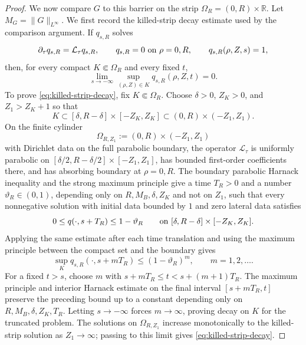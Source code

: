 \documentclass[11pt]{amsart}
\numberwithin{equation}{section}
\theoremstyle{plain}
\theoremstyle{definition}
\theoremstyle{remark}
\begin{document}
\begin{proof}
We now compare \(G\) to this barrier on the strip
\(\Omega_R=(0,R)\times\mathbb R\).  Let
\(M_G=\|G\|_{L^\infty}\).  We first record the killed-strip decay estimate used
by the comparison argument.  If \(q_{s,R}\) solves
\[
   \partial_\tau q_{s,R}=\mathcal L_\tau q_{s,R},
   \qquad q_{s,R}=0\hbox{ on }\rho=0,R,
   \qquad q_{s,R}(\rho,Z,s)=1,
\]
then, for every compact \(K\Subset\Omega_R\) and every fixed \(t\),
\begin{equation}\label{eq:killed-strip-decay}
   \lim_{s\to-\infty}\sup_{(\rho,Z)\in K}q_{s,R}(\rho,Z,t)=0 .
\end{equation}
To prove \eqref{eq:killed-strip-decay}, fix \(K\Subset\Omega_R\).  Choose
\(\delta>0\), \(Z_K>0\), and \(Z_1>Z_K+1\) so that
\[
   K\subset [\delta,R-\delta]\times[-Z_K,Z_K]
   \subset (0,R)\times(-Z_1,Z_1).
\]
On the finite cylinder
\[
   \Omega_{R,Z_1}:=(0,R)\times(-Z_1,Z_1)
\]
with Dirichlet data on the full parabolic boundary, the operator
\(\mathcal L_\tau\) is uniformly parabolic on
\([\delta/2,R-\delta/2]\times[-Z_1,Z_1]\), has bounded first-order coefficients
there, and has absorbing boundary at \(\rho=0,R\).  The boundary parabolic
Harnack inequality and the strong maximum principle give a time \(T_R>0\) and a
number \(\vartheta_R\in(0,1)\), depending only on
\(R,M_B,\delta,Z_K\) and not on \(Z_1\), such that every nonnegative solution
with initial data bounded by \(1\) and zero lateral data satisfies
\[
   0\le q(\cdot,s+T_R)\le 1-\vartheta_R
   \qquad\hbox{on }[\delta,R-\delta]\times[-Z_K,Z_K].
\]
Applying the same estimate after each time translation and using the maximum
principle between the compact set and the boundary gives
\[
   \sup_K q_{s,R}(\cdot,s+mT_R)
   \le (1-\vartheta_R)^m,\qquad m=1,2,\dots .
\]
For a fixed \(t>s\), choose \(m\) with
\(s+mT_R\le t<s+(m+1)T_R\).  The maximum principle and interior Harnack estimate
on the final interval \([s+mT_R,t]\) preserve the preceding bound up to a
constant depending only on \(R,M_B,\delta,Z_K,T_R\).  Letting \(s\to-\infty\)
forces \(m\to\infty\), proving decay on \(K\) for the truncated problem.  The
solutions on \(\Omega_{R,Z_1}\) increase monotonically to the killed-strip
solution as \(Z_1\to\infty\); passing to this limit gives
\eqref{eq:killed-strip-decay}.


\end{proof}
\end{document}
